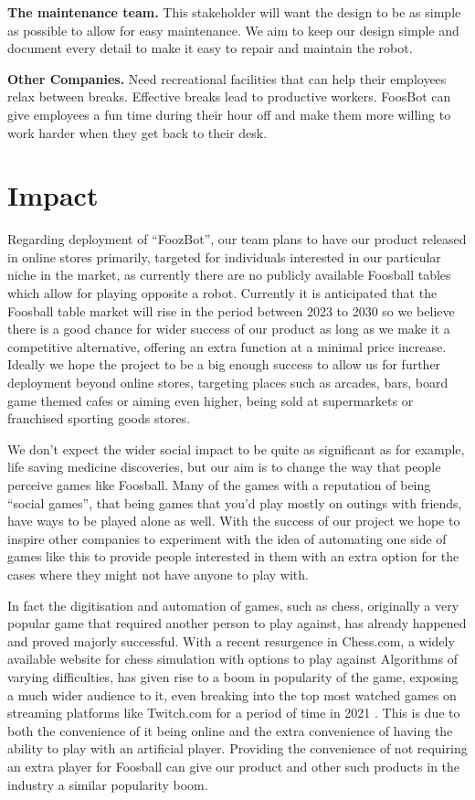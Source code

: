 \documentclass{article}
\begin{document}
\textbf{The maintenance team.} This stakeholder will want the design to be as simple as possible to allow for easy maintenance. We aim to keep our design simple and document every detail to make it easy to repair and maintain the robot.

\textbf{Other Companies.} Need recreational facilities that can help their employees relax between breaks. Effective breaks lead to productive workers\cite{albulescu2022give}. FoosBot can give employees a fun time during their hour off and make them more willing to work harder when they get back to their desk.

\section{Impact}
Regarding deployment of “FoozBot”, our team plans to have our product released in online stores primarily, targeted for individuals interested in our particular niche in the market, as currently there are no publicly available Foosball tables which allow for playing opposite a robot. Currently it is anticipated that the Foosball table market will rise in the period between 2023 to 2030 \cite{marketInsight} so we believe there is a good chance for wider success of our product as long as we make it a competitive alternative, offering an extra function at a minimal price increase. Ideally we hope the project to be a big enough success to allow us for further deployment beyond online stores, targeting places such as arcades, bars, board game themed cafes or aiming even higher, being sold at supermarkets or franchised sporting goods stores.

We don’t expect the wider social impact to be quite as significant as for example, life saving medicine discoveries, but our aim is to change the way that people perceive games like Foosball. Many of the games with a reputation of being “social games”, that being games that you’d play mostly on outings with friends, have ways to be played alone as well. With the success of our project we hope to inspire other companies to experiment with the idea of automating one side of games like this to provide people interested in them with an extra option for the cases where they might not have anyone to play with. 

In fact the digitisation and automation of games, such as chess, originally a very popular game that required another person to play against, has already happened and proved majorly successful. With a recent resurgence in Chess.com, a widely available website for chess simulation with options to play against Algorithms of varying difficulties, has given rise to a boom in popularity of the game, exposing a much wider audience to it, even breaking into the top most watched games on streaming platforms like Twitch.com for a period of time in 2021 \cite{twitchTracker}. This is due to both the convenience of it being online and the extra convenience of having the ability to play with an artificial player. Providing the convenience of not requiring an extra player for Foosball can give our product and other such products in the industry a similar popularity boom.
\end{document}
